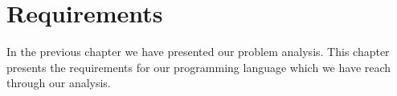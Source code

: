 \chapter{Requirements}
In the previous chapter we have presented our problem analysis. This chapter presents the requirements for our programming language which we have reach through our analysis.

